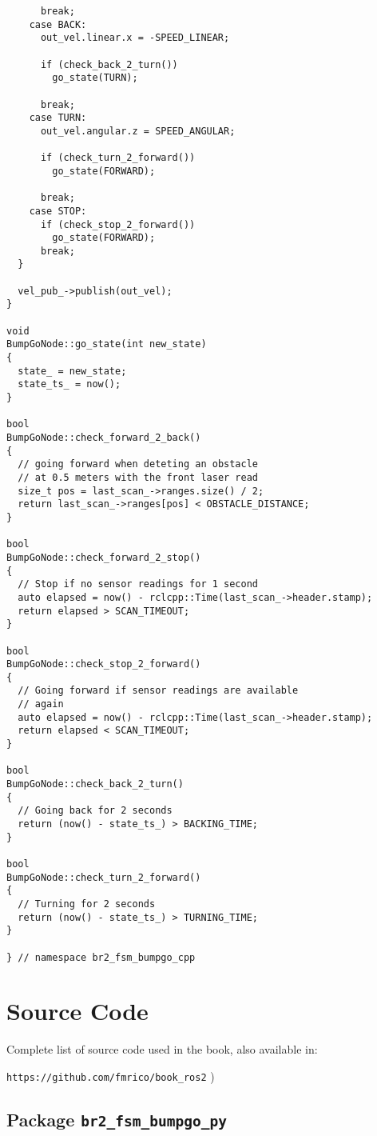 \begin{tcolorbox}[sharp corners, colframe=gray!80, colback=LightGray, left=0pt, top=0pt, bottom=0pt, title=\texttt{br2\_fsm\_bumpgo\_cpp/src/br2\_fsm\_bumpgo\_cpp/BumpGoNode.cpp}]
\begin{verbatim}
      break;
    case BACK:
      out_vel.linear.x = -SPEED_LINEAR;

      if (check_back_2_turn())
        go_state(TURN);

      break;
    case TURN:
      out_vel.angular.z = SPEED_ANGULAR;

      if (check_turn_2_forward())
        go_state(FORWARD);

      break;
    case STOP:
      if (check_stop_2_forward())
        go_state(FORWARD);
      break;
  }

  vel_pub_->publish(out_vel);
}

void
BumpGoNode::go_state(int new_state)
{
  state_ = new_state;
  state_ts_ = now();
}

bool 
BumpGoNode::check_forward_2_back() 
{
  // going forward when deteting an obstacle
  // at 0.5 meters with the front laser read
  size_t pos = last_scan_->ranges.size() / 2;
  return last_scan_->ranges[pos] < OBSTACLE_DISTANCE;
}
  
bool
BumpGoNode::check_forward_2_stop()
{
  // Stop if no sensor readings for 1 second
  auto elapsed = now() - rclcpp::Time(last_scan_->header.stamp);
  return elapsed > SCAN_TIMEOUT;
}

bool 
BumpGoNode::check_stop_2_forward()
{
  // Going forward if sensor readings are available
  // again
  auto elapsed = now() - rclcpp::Time(last_scan_->header.stamp);
  return elapsed < SCAN_TIMEOUT;
}

bool
BumpGoNode::check_back_2_turn()
{
  // Going back for 2 seconds
  return (now() - state_ts_) > BACKING_TIME;
}

bool
BumpGoNode::check_turn_2_forward()
{
  // Turning for 2 seconds
  return (now() - state_ts_) > TURNING_TIME;
}

} // namespace br2_fsm_bumpgo_cpp     \end{verbatim}
    \end{tcolorbox}
  \normalsize



\appendix

\chapter[Source Code]{Source Code}
\label{cap:source}
Complete list of source code used in the book, also available in:

\vspace{0.5cm}
\large
\texttt{https://github.com/fmrico/book\_ros2}
\normalsize
)
\section{Package \texttt{br2\_fsm\_bumpgo\_py}}
\label{sec:anex:br2_fsm_bumpgo_py}

